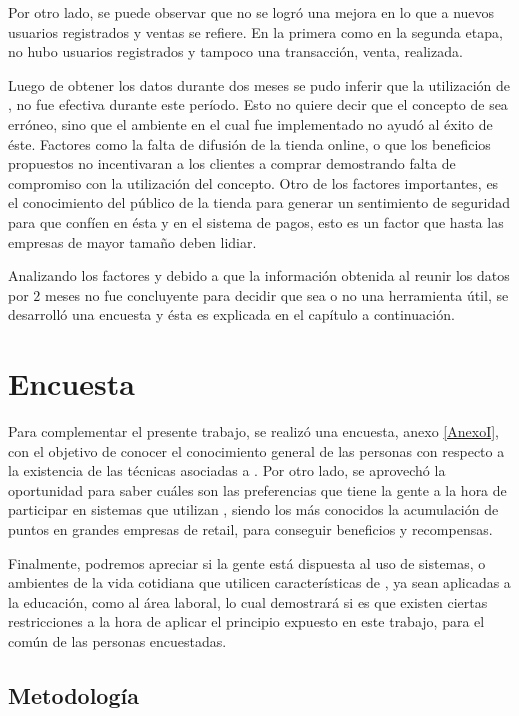 Por otro lado, se puede observar que no se logró una mejora en lo que a nuevos
usuarios registrados y ventas se refiere.
En la primera como en la segunda etapa, no hubo usuarios registrados y tampoco
una transacción, venta, realizada.

Luego de obtener los datos durante dos meses se pudo inferir que la utilización
de {\gam}, no fue efectiva durante este período. Esto no quiere decir que el concepto
de {\gam} sea erróneo, sino que el ambiente en el cual fue implementado no ayudó
al éxito de éste. Factores como la falta de difusión de la tienda online,
 o que los beneficios propuestos no incentivaran a
 los clientes a comprar demostrando falta de compromiso con la utilización del
concepto. Otro de los factores importantes, es el conocimiento del público de la tienda 
para generar un sentimiento de seguridad para que confíen en ésta y en el sistema de pagos, 
esto es un factor que hasta las empresas de mayor tamaño deben lidiar.

Analizando los factores y debido a que la información obtenida al reunir los datos por $2$
 meses no fue concluyente para decidir que {\gam} sea o no una herramienta útil, se
desarrolló una encuesta y ésta es explicada en el capítulo a continuación.

\section{Encuesta}

Para complementar el presente trabajo, se realizó una encuesta, anexo \ref{AnexoI}, con el objetivo de
conocer el conocimiento general de las personas con respecto a la existencia
de las técnicas asociadas a {\gam}.
Por otro lado, se aprovechó la oportunidad para saber cuáles son las preferencias
que tiene la gente a la hora de participar en sistemas que utilizan {\gam},
siendo los más conocidos la acumulación de puntos en grandes empresas de retail,
para conseguir beneficios y recompensas.

Finalmente, podremos apreciar si la gente está dispuesta al uso de sistemas,
o ambientes de la vida cotidiana que utilicen características de {\gam},
ya sean aplicadas a la educación, como al área laboral, lo cual demostrará
 si es que existen ciertas restricciones a la hora de aplicar
el principio expuesto en este trabajo, para el común de las personas
encuestadas.

\subsection{Metodología}

